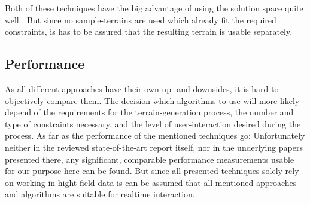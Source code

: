 Both of these techniques have the big advantage of using the solution space quite well \cite{raffe2012survey}. But since no sample-terrains are used which already fit the required constraints, is has to be assured that the resulting terrain is usable separately.

\subsection{Performance}
As all different approaches have their own up- and downsides, it is hard to objectively compare them. The decision which algorithms to use will more likely depend of the requirements for the terrain-generation process, the number and type of constraints necessary, and the level of user-interaction desired during the process. As far as the performance of the mentioned techniques go: Unfortunately neither in the reviewed state-of-the-art report itself, nor in the underlying papers presented there, any significant, comparable performance measurements usable for our purpose here can be found. But since all presented techniques solely rely on working in hight field data is can be assumed that all mentioned approaches and algorithms are suitable for realtime interaction.